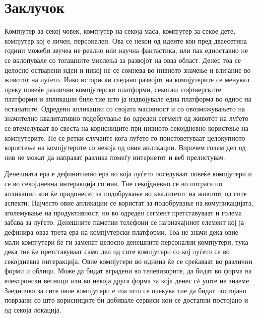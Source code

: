 \chapter{Заклучок} 

Компјутер за секој човек, компјутер на секоја маса, компјутер за секое дете,
компјутер кој е личен, персонален. Ова се некои од идеите кои пред дваесетина
години можеби звучеа не реално или научна фантастика, или пак едноставно не се
вклопувале со тогашните мислења за развојот на оваа област. Денес тоа се целосно
остварени идеи и никој не се сомнева во нивното значење и влијание во животот на
луѓето. Иако историски гледано развојот на компјутерите се менувал преку повеќе
различни компјутерски платформи, секогаш софтверските платформи и апликации биле
тие што ја издвојувале една платформа во однос на останатите. Одредени апликации
со својата масовност и со овозможувањето на значително квалитативно подобрување
во одреден сегмент од животот на луѓето се втемелуваат во свеста на корисниците
при нивното секојдневно користење на компјутерите. Не се ретки случаите кога
луѓето го поистоветуваат целокупното користење на компјутерите со некоја од овие
апликации. Впрочем голем дел од нив не можат да направат разлика помеѓу
интернетот и веб прелистувач.

Денешната ера
е дефинитивно ера во која луѓето поседуваат повеќе компјутери и се во
секојдневна интеракција со нив. Тие секојдневно се во потрага по апликации кои
ќе придонесат за подобрување во квалитетот на животот од сите аспекти. Најчесто
овие апликации се користат за подобрување на комуникацијата, зголемување на
продуктивност, но во одреден сегмент претставуваат и голема забава за луѓето.
Денешните паметни телефони се најзначајниот елемент кој ја дефинира оваа трета
ера на компјутерски платформи. Тоа не значи дека овие мали компјутери ќе ги
заменат целосно денешните персонални компјутери, тука дека тие ќе претставуваат
само дел од сите компјутери со кој луѓето се во секојдневна интеракција. Овие
компјутери во иднина ќе се среќаваат во различни форми и облици. Може да бидат
вградени во телевизорите, да бидат во форма на електронски весници или во некоја
друга форма за која денес сè уште не знаеме. Заедничко за сите овие компјутери е
тоа што се очекува тие да бидат постојано поврзани со што корисниците би
добивале сервиси кои се достапни постојано и од секоја локација. 

